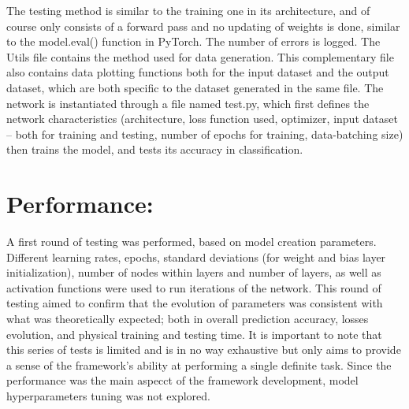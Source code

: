 \documentclass[10pt, a4paper]{article}
\begin{document}
The testing method is similar to the training one in its architecture, and of course only consists of a forward pass and no updating of weights is done, similar to the model.eval() function in PyTorch. The number of errors is logged. 
The Utils file contains the method used for data generation. This complementary file also contains data plotting functions both for the input dataset and the output dataset, which are both specific to the dataset generated in the same file.
The network is instantiated through a file named test.py, which first defines the network characteristics (architecture, loss function used, optimizer, input dataset -- both for training and testing, number of epochs for training, data-batching size) then trains the model, and tests its accuracy in classification. 


\section{Performance:}A first round of testing was performed, based on model creation parameters. Different  learning rates, epochs, standard deviations (for weight and bias layer initialization), number of nodes within layers and number of layers, as well as activation functions were used to run iterations of the network. This round of testing aimed to confirm that the evolution of parameters was consistent with what was theoretically expected; both in overall prediction accuracy, losses evolution, and physical training and testing time. 
It is important to note that this series of tests is limited and is in no way exhaustive but only aims to provide a sense of the framework's ability at performing a single definite task.
Since the performance was the main aspecct of the framework development, model hyperparameters tuning was not explored.
\end{document}
